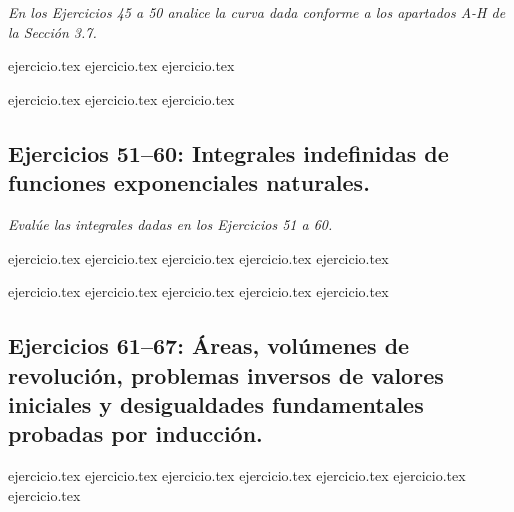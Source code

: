 \noindent \textit{En los Ejercicios 45 a 50 analice la curva dada conforme a los apartados A-H de la Sección 3.7.}

\begin{enumerate}
    \setcounter{enumi}{44}
    \begin{minipage}{0.45\textwidth}
    {ejercicio.tex}
    {ejercicio.tex}
    {ejercicio.tex}
    \end{minipage}%
    \begin{minipage}{0.45\textwidth}
    {ejercicio.tex}
    {ejercicio.tex}
    {ejercicio.tex}
    \end{minipage}
\end{enumerate}

\subsection*{Ejercicios 51--60: Integrales indefinidas de funciones exponenciales naturales.}

\noindent \textit{Evalúe las integrales dadas en los Ejercicios 51 a 60.}

\begin{enumerate}
    \setcounter{enumi}{50}
    \begin{minipage}{0.45\textwidth}
    {ejercicio.tex}
    {ejercicio.tex}
    {ejercicio.tex}
    {ejercicio.tex}
    {ejercicio.tex}
    \end{minipage}%
    \begin{minipage}{0.45\textwidth}
    {ejercicio.tex}
    {ejercicio.tex}
    {ejercicio.tex}
    {ejercicio.tex}
    {ejercicio.tex}
    \end{minipage}
\end{enumerate}

\subsection*{Ejercicios 61--67: Áreas, volúmenes de revolución, problemas inversos de valores iniciales y desigualdades fundamentales probadas por inducción.}

\begin{enumerate}
    \setcounter{enumi}{60}
    {ejercicio.tex}
    {ejercicio.tex}
    {ejercicio.tex}
    {ejercicio.tex}
    {ejercicio.tex}
    {ejercicio.tex}
    {ejercicio.tex}
\end{enumerate}
